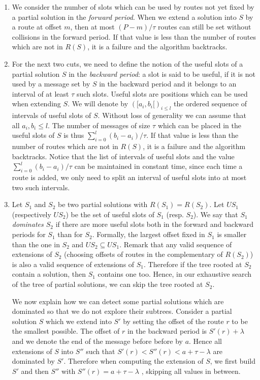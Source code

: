 \documentclass[a4paper,10pt]{article}
\begin{document}
      \begin{enumerate}
       \item We consider the number of slots which can be used by routes not yet fixed by a partial solution in the \emph{forward period}. When we extend a solution into $S$ by a route at offset $m$, then at most $(P - m) / \tau $ routes can still be set without collisions in the forward period. If that value is less than the number of routes which are not in $R(S)$, it is a failure and the algorithm backtracks.
       
       \item 
       For the next two cuts, we need to define the notion of the useful slots of a partial solution $S$ in the \emph{backward period}: a slot is said to be useful, if it is not used by a message set by $S$ in the backward period and it belongs to an interval of at least $\tau$ such slots. Useful slots are positions which can be used when extending $S$. We will denote by $([a_i,b_i[)_{i\leq l}$ the ordered sequence of intervals of useful slots of $S$. Without loss of generality we can assume that all $a_i, b_i \leq l$. The number of messages of size $\tau$ which can be placed in the useful slots of $S$ is thus  $\displaystyle{ \sum_{i=0}^{l} (b_{i} -a_i)/\tau } $. If that value is less than the number of routes which are not in $R(S)$, it is a failure and the algorithm backtracks. Notice that the list of intervals of useful slots and the value $\displaystyle{ \sum_{i=0}^{l} (b_{i} -a_i)/\tau } $ can be maintained in constant time, since each time a route is added, we only need to split an interval of useful slots into at most two such intervals.
       
       
       \item 
       Let $S_1$ and $S_2$ be two partial solutions with $R(S_1) = R(S_2)$. Let $US_1$ (respectively $US_2$) be the set of useful slots of $S_1$ (resp. $S_2$). We say that \emph{$S_1$ dominates $S_2$} if there are more useful slots both in the forward and backward periods for $S_1$ than for $S_2$. Formally, the largest offset fixed in $S_1$ is smaller than the one in $S_2$ and $US_2 \subseteq US_1$. Remark that any valid sequence of extensions of $S_2$ (choosing offsets of routes in the complementary of $R(S_2)$) is also a valid sequence of extensions of $S_1$. Therefore if the tree rooted at $S_2$ contain a solution, then $S_1$ contains one too. Hence, in our exhaustive search of the tree of partial solutions, we can skip the tree rooted at $S_2$.
       
       We now explain how we can detect some partial solutions which are dominated so that we do not explore their subtrees.
       Consider a partial solution $S$ which we extend into $S'$ by setting the offset of the route $r$ to be the smallest possible. The offset of $r$ in the backward period is $S'(r)+ \lambda$ and we denote the end of the message before before by $a$. Hence all extensions of $S$ into $S''$ such that $S'(r)  < S''(r) < a + \tau - \lambda$ are dominated by $S'$. Therefore when computing the extension of $S$, we first build $S'$ and then $S''$ with $S''(r) =  a + \tau - \lambda$ , skipping all values in between.
       
             \end{enumerate}
\end{document}

